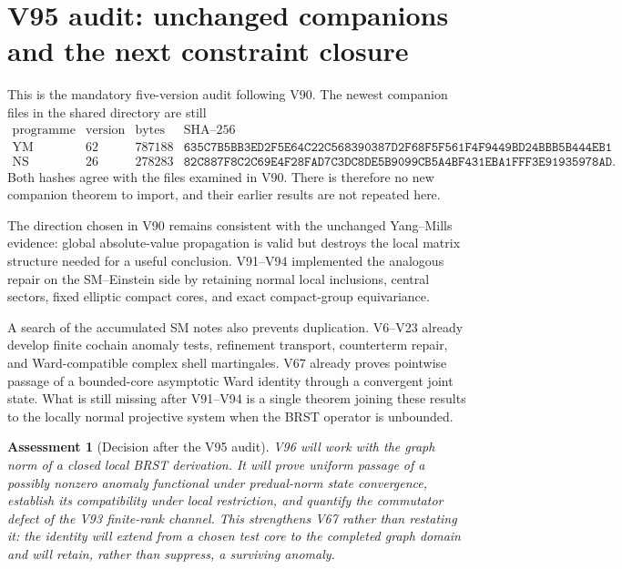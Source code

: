 \documentclass[11pt]{article}
\newtheorem{assessment}[theorem]{Assessment}
\theoremstyle{remark}
\begin{document}


\section{V95 audit: unchanged companions and the next constraint
closure}
\label{sec:v12v95}

This is the mandatory five-version audit following V90.  The newest
companion files in the shared directory are still
\[
\begin{array}{c|c|c|c}
\text{programme}&\text{version}&\text{bytes}&\text{SHA--256}\\ \hline
\mathrm{YM}&62&787188&
\texttt{635C7B5BB3ED2F5E64C22C568390387D2F68F5F561F4F9449BD24BBB5B444EB1}\\
\mathrm{NS}&26&278283&
\texttt{82C887F8C2C69E4F28FAD7C3DC8DE5B9099CB5A4BF431EBA1FFF3E91935978AD}.
\end{array}
\]
Both hashes agree with the files examined in V90.  There is
therefore no new companion theorem to import, and their earlier
results are not repeated here.

The direction chosen in V90 remains consistent with the unchanged
Yang--Mills evidence: global absolute-value propagation is valid but
destroys the local matrix structure needed for a useful conclusion.
V91--V94 implemented the analogous repair on the SM--Einstein side
by retaining normal local inclusions, central sectors, fixed
elliptic compact cores, and exact compact-group equivariance.

A search of the accumulated SM notes also prevents duplication.
V6--V23 already develop finite cochain anomaly tests, refinement
transport, counterterm repair, and Ward-compatible complex shell
martingales.  V67 already proves pointwise passage of a bounded-core
asymptotic Ward identity through a convergent joint state.  What is
still missing after V91--V94 is a single theorem joining these
results to the locally normal projective system when the BRST
operator is unbounded.

\begin{assessment}[Decision after the V95 audit]
\label{ass:v12v95-decision}
V96 will work with the graph norm of a closed local BRST derivation.
It will prove uniform passage of a possibly nonzero anomaly
functional under predual-norm state convergence, establish its
compatibility under local restriction, and quantify the commutator
defect of the V93 finite-rank channel.  This strengthens V67 rather
than restating it: the identity will extend from a chosen test core
to the completed graph domain and will retain, rather than suppress,
a surviving anomaly.
\end{assessment}
\end{document}
